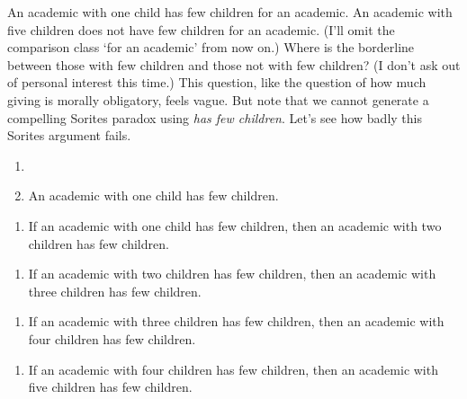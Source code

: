 \documentclass[
  11pt,
  letterpaper,
  DIV=11,
  numbers=noendperiod,
  twoside]{scrartcl}
\providecommand{\tightlist}{%
  \setlength{\itemsep}{0pt}\setlength{\parskip}{0pt}}\usepackage{longtable,booktabs,array}
\begin{document}
An academic with one child has few children for an academic. An academic
with five children does not have few children for an academic. (I'll
omit the comparison class `for an academic' from now on.) Where is the
borderline between those with few children and those not with few
children? (I don't ask out of personal interest this time.) This
question, like the question of how much giving is morally obligatory,
feels vague. But note that we cannot generate a compelling Sorites
paradox using \emph{has few children}. Let's see how badly this Sorites
argument fails.

\begin{description}
\tightlist
\item[(2)]
\begin{enumerate}
\def\labelenumi{(\alph{enumi})}
\tightlist
\item[]
\item
  An academic with one child has few children.
\end{enumerate}

\begin{enumerate}
\def\labelenumi{(\alph{enumi})}
\setcounter{enumi}{1}
\tightlist
\item
  If an academic with one child has few children, then an academic with
  two children has few children.
\end{enumerate}

\begin{enumerate}
\def\labelenumi{(\alph{enumi})}
\setcounter{enumi}{2}
\tightlist
\item
  If an academic with two children has few children, then an academic
  with three children has few children.
\end{enumerate}

\begin{enumerate}
\def\labelenumi{(\alph{enumi})}
\setcounter{enumi}{3}
\tightlist
\item
  If an academic with three children has few children, then an academic
  with four children has few children.
\end{enumerate}

\begin{enumerate}
\def\labelenumi{(\alph{enumi})}
\setcounter{enumi}{4}
\tightlist
\item
  If an academic with four children has few children, then an academic
  with five children has few children.
\end{enumerate}
\end{description}
\end{document}
